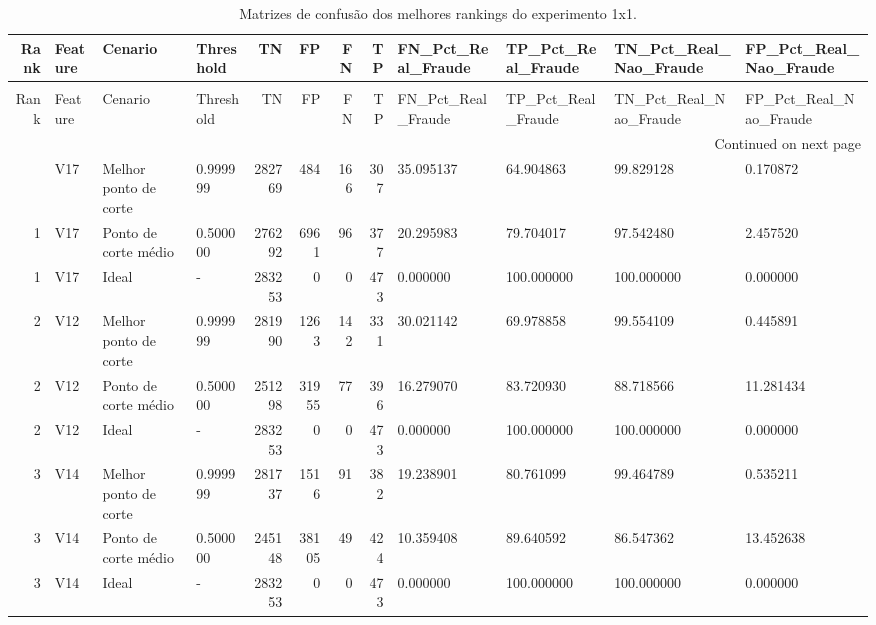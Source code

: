 \begin{longtable}{rlllrrrrllll}
\caption{Matrizes de confusão dos melhores rankings do experimento 1x1.} \label{tab:matrizes-confusao-ranks-1x1} \\
\toprule
Rank & Feature & Cenario & Threshold & TN & FP & FN & TP & FN\_Pct\_Real\_Fraude & TP\_Pct\_Real\_Fraude & TN\_Pct\_Real\_Nao\_Fraude & FP\_Pct\_Real\_Nao\_Fraude \\
\midrule
\endfirsthead
\caption[]{Matrizes de confusão dos melhores rankings do experimento 1x1.} \\
\toprule
Rank & Feature & Cenario & Threshold & TN & FP & FN & TP & FN\_Pct\_Real\_Fraude & TP\_Pct\_Real\_Fraude & TN\_Pct\_Real\_Nao\_Fraude & FP\_Pct\_Real\_Nao\_Fraude \\
\midrule
\endhead
\midrule
\multicolumn{12}{r}{Continued on next page} \\
\midrule
\endfoot
\bottomrule
\endlastfoot
1 & V17 & Melhor ponto de corte & 0.999999 & 282769 & 484 & 166 & 307 & 35.095137 & 64.904863 & 99.829128 & 0.170872 \\
1 & V17 & Ponto de corte médio & 0.500000 & 276292 & 6961 & 96 & 377 & 20.295983 & 79.704017 & 97.542480 & 2.457520 \\
1 & V17 & Ideal & - & 283253 & 0 & 0 & 473 & 0.000000 & 100.000000 & 100.000000 & 0.000000 \\
2 & V12 & Melhor ponto de corte & 0.999999 & 281990 & 1263 & 142 & 331 & 30.021142 & 69.978858 & 99.554109 & 0.445891 \\
2 & V12 & Ponto de corte médio & 0.500000 & 251298 & 31955 & 77 & 396 & 16.279070 & 83.720930 & 88.718566 & 11.281434 \\
2 & V12 & Ideal & - & 283253 & 0 & 0 & 473 & 0.000000 & 100.000000 & 100.000000 & 0.000000 \\
3 & V14 & Melhor ponto de corte & 0.999999 & 281737 & 1516 & 91 & 382 & 19.238901 & 80.761099 & 99.464789 & 0.535211 \\
3 & V14 & Ponto de corte médio & 0.500000 & 245148 & 38105 & 49 & 424 & 10.359408 & 89.640592 & 86.547362 & 13.452638 \\
3 & V14 & Ideal & - & 283253 & 0 & 0 & 473 & 0.000000 & 100.000000 & 100.000000 & 0.000000 \\
\end{longtable}
